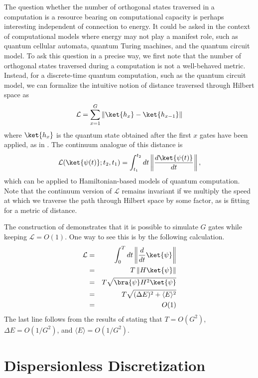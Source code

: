 \documentclass[11pt]{article}
\begin{document}
The question whether the number of orthogonal states traversed in a computation is a resource bearing on computational capacity is perhaps interesting independent of connection to energy. It could be asked in the context of computational models where energy may not play a manifest role, such as quantum cellular automata, quantum Turing machines, and the quantum circuit model. To ask this question in a precise way, we first note that the number of orthogonal states traversed during a computation is not a well-behaved metric. Instead, for a discrete-time quantum computation, such as the quantum circuit model, we can formalize the intuitive notion of distance traversed through Hilbert space as
\begin{equation}
\mathcal{L} = \sum_{x = 1}^G \left\| \ket{h_x} - \ket{h_{x-1}} \right\|
\end{equation}
where $\ket{h_x}$ is the quantum state obtained after the first $x$ gates have been applied, as in . The continuum analogue of this distance is
\begin{equation}
\mathcal{L}(\ket{\psi(t)};t_2,t_1) = \int_{t_1}^{t_2} dt \left\| \frac{d \ket{\psi(t)}}{dt} \right\|,
\end{equation}
which can be applied to Hamiltonian-based models of quantum computation. Note that the continuum version of $\mathcal{L}$ remains invariant if we multiply the speed at which we traverse the path through Hilbert space by some factor, as is fitting for a metric of distance.

The construction of  demonstrates that it is possible to simulate $G$ gates while keeping $\mathcal{L}=O(1)$. One way to see this is by the following calculation.
\begin{eqnarray}
\mathcal{L} & = & \int_0^T dt \left\| \frac{d}{dt} \ket{\psi} \right\| \\
& = & T \left\| H \ket{\psi} \right\| \\
& = & T \sqrt{\bra{\psi} H^2 \ket{\psi}} \\
& = & T \sqrt{(\Delta E)^2 + \langle E \rangle^2} \\
& = & O(1)
\end{eqnarray}
The last line follows from the results of  stating that $T = O(G^2)$, $\Delta E = O(1/G^2)$, and $\langle E \rangle = O(1/G^2)$. 

\section{Dispersionless Discretization}
\label{sec:dispersionless}
\end{document}
